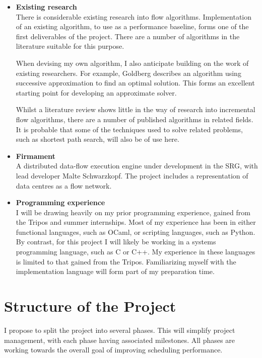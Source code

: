 \begin{itemize}
  \item \textbf{Existing research} \\
    There is considerable existing research into flow algorithms. Implementation of an existing algorithm, to use as a performance baseline, forms one of the first deliverables of the project. There are a number of algorithms in the literature suitable for this purpose.\cite{Goldberg:1992,Zolt:2012}
    
    When devising my own algorithm, I also anticipate building on the work of existing researchers. For example, Goldberg\cite{Goldberg:1987} describes an algorithm using successive approximation to find an optimal solution. This forms an excellent starting point for developing an approximate solver.

    Whilst a literature review shows little in the way of research into incremental flow algorithms, there are a number of published algorithms in related fields. It is probable that some of the techniques used to solve related problems, such as shortest path search, will also be of use here.\cite{Ramalingam:1996,Roddity:2011}
  \item \textbf{Firmament} \\
    A distributed data-flow execution engine under development in the SRG, with lead developer Malte Schwarzkopf. The project includes a representation of data centres as a flow network.
  \item \textbf{Programming experience} \\ 
    I will be drawing heavily on my prior programming experience, gained from the Tripos and summer internships. Most of my experience has been in either functional languages, such as OCaml, or scripting languages, such as Python. By contrast, for this project I will likely be working in a systems programming language, such as C or C++. My experience in these languages is limited to that gained from the Tripos. Familiarizing myself with the implementation language will form part of my preparation time.
\end{itemize}

\section*{Structure of the Project}

I propose to split the project into several phases. This will simplify project management, with each phase having associated milestones. All phases are working towards the overall goal of improving scheduling performance.


